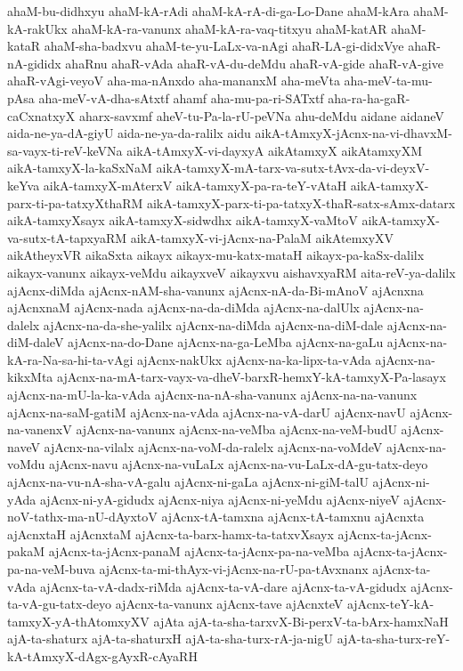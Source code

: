 {ahaM-bu-didhxyu
ahaM-kA-rAdi
ahaM-kA-rA-di-ga-Lo-Dane
ahaM-kAra
ahaM-kA-rakUkx
ahaM-kA-ra-vanunx
ahaM-kA-ra-vaq-titxyu
ahaM-katAR
ahaM-kataR
ahaM-sha-badxvu
ahaM-te-yu-LaLx-va-nAgi
ahaR-LA-gi-didxVye
ahaR-nA-gididx
ahaRnu
ahaR-vAda
ahaR-vA-du-deMdu
ahaR-vA-gide
ahaR-vA-give
ahaR-vAgi-veyoV
aha-ma-nAnxdo
aha-mananxM
aha-meVta
aha-meV-ta-mu-pAsa
aha-meV-vA-dha-sAtxtf
ahamf
aha-mu-pa-ri-SATxtf
aha-ra-ha-gaR-caCxnatxyX
aharx-savxmf
aheV-tu-Pa-la-rU-peVNa
ahu-deMdu
aidane
aidaneV
aida-ne-ya-dA-giyU
aida-ne-ya-da-ralilx
aidu
aikA-tAmxyX-jAcnx-na-vi-dhavxM-sa-vayx-ti-reV-keVNa
aikA-tAmxyX-vi-dayxyA
aikAtamxyX
aikAtamxyXM
aikA-tamxyX-la-kaSxNaM
aikA-tamxyX-mA-tarx-va-sutx-tAvx-da-vi-deyxV-keYva
aikA-tamxyX-mAterxV
aikA-tamxyX-pa-ra-teY-vAtaH
aikA-tamxyX-parx-ti-pa-tatxyXthaRM
aikA-tamxyX-parx-ti-pa-tatxyX-thaR-satx-sAmx-datarx
aikA-tamxyXsayx
aikA-tamxyX-sidwdhx
aikA-tamxyX-vaMtoV
aikA-tamxyX-va-sutx-tA-tapxyaRM
aikA-tamxyX-vi-jAcnx-na-PalaM
aikAtemxyXV
aikAtheyxVR
aikaSxta
aikayx
aikayx-mu-katx-mataH
aikayx-pa-kaSx-dalilx
aikayx-vanunx
aikayx-veMdu
aikayxveV
aikayxvu
aishavxyaRM
aita-reV-ya-dalilx
ajAcnx-diMda
ajAcnx-nAM-sha-vanunx
ajAcnx-nA-da-Bi-mAnoV
ajAcnxna
ajAcnxnaM
ajAcnx-nada
ajAcnx-na-da-diMda
ajAcnx-na-dalUlx
ajAcnx-na-dalelx
ajAcnx-na-da-she-yalilx
ajAcnx-na-diMda
ajAcnx-na-diM-dale
ajAcnx-na-diM-daleV
ajAcnx-na-do-Dane
ajAcnx-na-ga-LeMba
ajAcnx-na-gaLu
ajAcnx-na-kA-ra-Na-sa-hi-ta-vAgi
ajAcnx-nakUkx
ajAcnx-na-ka-lipx-ta-vAda
ajAcnx-na-kikxMta
ajAcnx-na-mA-tarx-vayx-va-dheV-barxR-hemxY-kA-tamxyX-Pa-lasayx
ajAcnx-na-mU-la-ka-vAda
ajAcnx-na-nA-sha-vanunx
ajAcnx-na-na-vanunx
ajAcnx-na-saM-gatiM
ajAcnx-na-vAda
ajAcnx-na-vA-darU
ajAcnx-navU
ajAcnx-na-vanenxV
ajAcnx-na-vanunx
ajAcnx-na-veMba
ajAcnx-na-veM-budU
ajAcnx-naveV
ajAcnx-na-vilalx
ajAcnx-na-voM-da-ralelx
ajAcnx-na-voMdeV
ajAcnx-na-voMdu
ajAcnx-navu
ajAcnx-na-vuLaLx
ajAcnx-na-vu-LaLx-dA-gu-tatx-deyo
ajAcnx-na-vu-nA-sha-vA-galu
ajAcnx-ni-gaLa
ajAcnx-ni-giM-talU
ajAcnx-ni-yAda
ajAcnx-ni-yA-gidudx
ajAcnx-niya
ajAcnx-ni-yeMdu
ajAcnx-niyeV
ajAcnx-noV-tathx-ma-nU-dAyxtoV
ajAcnx-tA-tamxna
ajAcnx-tA-tamxnu
ajAcnxta
ajAcnxtaH
ajAcnxtaM
ajAcnx-ta-barx-hamx-ta-tatxvXsayx
ajAcnx-ta-jAcnx-pakaM
ajAcnx-ta-jAcnx-panaM
ajAcnx-ta-jAcnx-pa-na-veMba
ajAcnx-ta-jAcnx-pa-na-veM-buva
ajAcnx-ta-mi-thAyx-vi-jAcnx-na-rU-pa-tAvxnanx
ajAcnx-ta-vAda
ajAcnx-ta-vA-dadx-riMda
ajAcnx-ta-vA-dare
ajAcnx-ta-vA-gidudx
ajAcnx-ta-vA-gu-tatx-deyo
ajAcnx-ta-vanunx
ajAcnx-tave
ajAcnxteV
ajAcnx-teY-kA-tamxyX-yA-thAtomxyXV
ajAta
ajA-ta-sha-tarxvX-Bi-perxV-ta-bArx-hamxNaH
ajA-ta-shaturx
ajA-ta-shaturxH
ajA-ta-sha-turx-rA-ja-nigU
ajA-ta-sha-turx-reY-kA-tAmxyX-dAgx-gAyxR-cAyaRH
}
